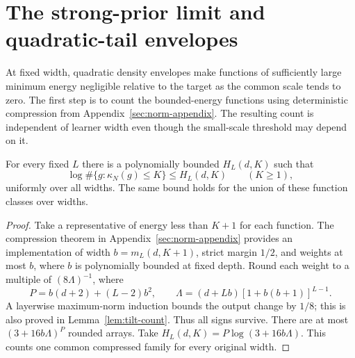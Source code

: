 \section{The strong-prior limit and quadratic-tail envelopes}\label{sec:strong}
At fixed width, quadratic density envelopes make functions of sufficiently
large minimum energy negligible relative to the target as the common
scale tends to zero. The first step is to count the bounded-energy
functions using deterministic compression from
Appendix~\ref{sec:norm-appendix}. The resulting count is independent of
learner width even though the small-scale threshold may depend on it.
\begin{lemma}\label{lem:energy-count}
For every fixed $L$ there is a polynomially bounded $H_L(d,K)$ such that
\[
 \log\#\{g:\kappa_N(g)\leq K\}\leq H_L(d,K)
 \qquad(K\geq1),
\]
uniformly over all widths. The same bound holds for the union of these
function classes over widths.
\end{lemma}
\begin{proof}
Take a representative of energy less than $K+1$ for each function. The
compression theorem in Appendix~\ref{sec:norm-appendix} provides an
implementation of width $b=m_L(d,K+1)$, strict margin $1/2$, and weights
at most $b$, where $b$ is polynomially bounded at fixed depth. Round each
weight to a multiple of $(8\Lambda)^{-1}$, where
\[
 P=b(d+2)+(L-2)b^2,\qquad
 \Lambda=(d+Lb)[1+b(b+1)]^{L-1}.
\]
A layerwise maximum-norm induction bounds the output change by $1/8$;
this is also proved in Lemma~\ref{lem:tilt-count}. Thus all signs survive.
There are at most $(3+16b\Lambda)^P$ rounded arrays. Take
$H_L(d,K)=P\log(3+16b\Lambda)$. This counts one common compressed family
for every original width.
\end{proof}

